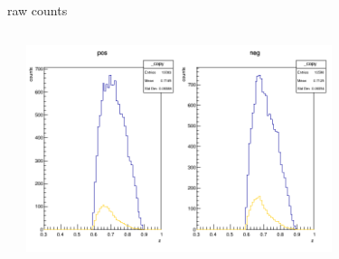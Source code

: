 \begin{frame}{raw counts}
\begin{columns}
\begin{column}[T]{0.5\textwidth}
\end{column}
\begin{column}[T]{0.5\textwidth}
\includegraphics[width = 0.7\textwidth]{results/yield/statistics/counts_x_Q2_z_0.50_5.500_0.70.png}
\end{column}
\end{columns}
\end{frame}
